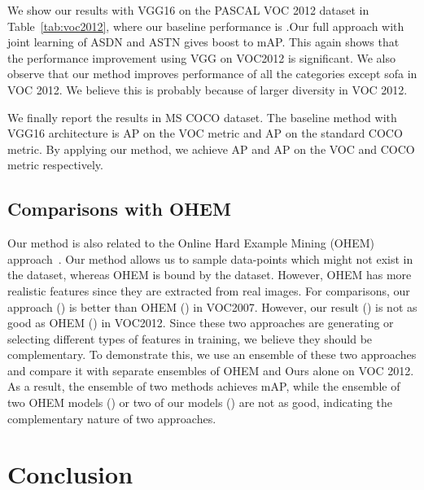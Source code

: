 \documentclass[10pt,twocolumn,letterpaper]{article}
\begin{document}
We show our results with VGG16 on the PASCAL VOC 2012 dataset in Table~\ref{tab:voc2012}, where our baseline performance is  .Our full approach with joint learning of ASDN and ASTN gives  boost to  mAP. This again shows that the performance improvement using VGG on VOC2012 is significant. We also observe that our method improves performance of all the categories except sofa in VOC 2012. We believe this is probably because of larger diversity in VOC 2012.



We finally report the results in MS COCO dataset. The baseline method with VGG16 architecture is   AP on the VOC metric and  AP on the standard COCO metric. By applying our method, we achieve  AP and  AP on the VOC and COCO metric respectively. 

\vspace{-0.05in}
\subsection{Comparisons with OHEM}
\vspace{-0.05in}
Our method is also related to the Online Hard Example Mining (OHEM) approach~\cite{shrivastavaOHEM}. Our method allows us to sample data-points which might not exist in the dataset, whereas OHEM is bound by the dataset. However, OHEM has more realistic features since they are extracted from real images. For comparisons, our approach () is better than OHEM () in VOC2007. However, our result () is not as good as OHEM () in VOC2012. Since these two approaches are generating or selecting different types of features in training,  we believe they should be complementary. To demonstrate this, we use an ensemble of these two approaches and compare it with separate ensembles of OHEM and Ours alone on VOC 2012. As a result, the ensemble of two methods achieves  mAP, while the ensemble of two OHEM models () or two of our models () are not as good, indicating the complementary nature of two approaches. 









 
\vspace{-0.05in}
\section{Conclusion}
\vspace{-0.05in}
\end{document}
